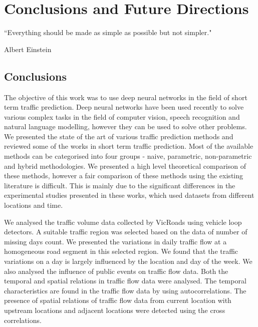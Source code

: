 
\chapter{Conclusions and Future Directions} %

\label{Chapter6} %


``Everything should be made as simple as possible but not simpler."

\begin{flushright}
Albert Einstein
\end{flushright}


\section{Conclusions}

The objective of this work was to use deep neural networks in the field of short term traffic
prediction. Deep neural networks have been used recently to solve various complex tasks in the
field of computer vision, speech recognition and natural language modelling, however they can be
used to solve other problems. We presented the state of the art of various traffic prediction
methods and reviewed some of the works in short term traffic prediction. Most of the available
methods can be categorised into four groups - naive, parametric, non-parametric and hybrid
methodologies. We presented a high level theoretical comparison of these methods, however a fair
comparison of these methods using the existing literature is difficult. This is mainly due to the
significant differences in the experimental studies presented in these works, which used datasets
from different locations and time.

We analysed the traffic volume data collected by VicRoads using vehicle loop detectors. A suitable
traffic region was selected based on the data of number of missing days count. We presented the
variations in daily traffic flow at a homogeneous road segment in this selected region. We found
that the traffic variations on a day is largely influenced by the location and day of the week.
We also analysed the influence of public events on traffic flow data. Both the temporal and
spatial relations in traffic flow data were analysed. The temporal characteristics are found in the
traffic flow data by using autocorrelations. The presence of spatial relations of traffic flow
data from current location with upstream locations and adjacent locations were detected using the
cross correlations.

